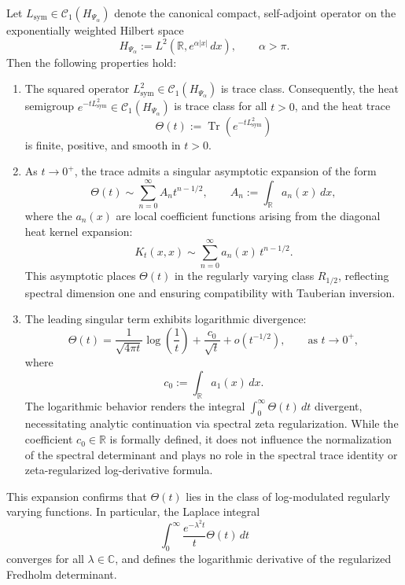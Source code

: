 \begin{lemma}
\label{lem:heat_trace_expansion}
Let \( L_{\mathrm{sym}} \in \mathcal{C}_1(H_{\Psi_\alpha}) \) denote the canonical compact, self-adjoint operator on the exponentially weighted Hilbert space
\[
H_{\Psi_\alpha} := L^2(\mathbb{R}, e^{\alpha|x|} \, dx), \qquad \alpha > \pi.
\]
Then the following properties hold:
\begin{enumerate}
    \item The squared operator \( L_{\mathrm{sym}}^2 \in \mathcal{C}_1(H_{\Psi_\alpha}) \) is trace class. Consequently, the heat semigroup \( e^{-t L_{\mathrm{sym}}^2} \in \mathcal{C}_1(H_{\Psi_\alpha}) \) is trace class for all \( t > 0 \), and the heat trace
    \[
    \Theta(t) := \operatorname{Tr}(e^{-t L_{\mathrm{sym}}^2})
    \]
    is finite, positive, and smooth in \( t > 0 \).

    \item As \( t \to 0^+ \), the trace admits a singular asymptotic expansion of the form
    \[
    \Theta(t) \sim \sum_{n=0}^{\infty} A_n t^{n - 1/2}, \qquad A_n := \int_{\mathbb{R}} a_n(x) \, dx,
    \]
    where the \( a_n(x) \) are local coefficient functions arising from the diagonal heat kernel expansion:
    \[
    K_t(x,x) \sim \sum_{n=0}^{\infty} a_n(x) \, t^{n - 1/2}.
    \]
    This asymptotic places \( \Theta(t) \) in the regularly varying class \( R_{1/2} \), reflecting spectral dimension one and ensuring compatibility with Tauberian inversion.

    \item The leading singular term exhibits logarithmic divergence:
    \[
    \Theta(t) = \frac{1}{\sqrt{4\pi t}} \log\left( \frac{1}{t} \right)
    + \frac{c_0}{\sqrt{t}} + o(t^{-1/2}), \qquad \text{as } t \to 0^+,
    \]
    where
    \[
    c_0 := \int_{\mathbb{R}} a_1(x) \, dx.
    \]
    The logarithmic behavior renders the integral \( \int_0^\infty \Theta(t) \, dt \) divergent, necessitating analytic continuation via spectral zeta regularization. While the coefficient \( c_0 \in \mathbb{R} \) is formally defined, it does not influence the normalization of the spectral determinant and plays no role in the spectral trace identity or zeta-regularized log-derivative formula.
\end{enumerate}

\medskip

\noindent
This expansion confirms that \( \Theta(t) \) lies in the class of log-modulated regularly varying functions. In particular, the Laplace integral
\[
\int_0^\infty \frac{e^{-\lambda^2 t}}{t} \Theta(t) \, dt
\]
converges for all \( \lambda \in \mathbb{C} \), and defines the logarithmic derivative of the regularized Fredholm determinant.
\end{lemma}

